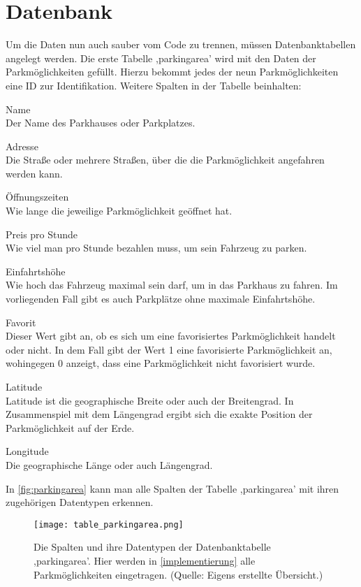 \section{Datenbank}
Um die Daten nun auch sauber vom Code zu trennen, müssen Datenbanktabellen angelegt werden. Die erste Tabelle ,parkingarea' wird mit den Daten der Parkmöglichkeiten gefüllt. Hierzu bekommt jedes der neun Parkmöglichkeiten eine ID zur Identifikation. Weitere Spalten in der Tabelle beinhalten:
\begin{description}
	\item Name \\ Der Name des Parkhauses oder Parkplatzes.
	\item Adresse \\ Die Straße oder mehrere Straßen, über die die Parkmöglichkeit angefahren werden kann.
	\item Öffnungszeiten \\ Wie lange die jeweilige Parkmöglichkeit geöffnet hat.
	\item Preis pro Stunde \\ Wie viel man pro Stunde bezahlen muss, um sein Fahrzeug zu parken.
	\item Einfahrtshöhe \\ Wie hoch das Fahrzeug maximal sein darf, um in das Parkhaus zu fahren. Im vorliegenden Fall gibt es auch Parkplätze ohne maximale Einfahrtshöhe.
	\item Favorit \\ Dieser Wert gibt an, ob es sich um eine favorisiertes Parkmöglichkeit handelt oder nicht. In dem Fall gibt der Wert 1 eine favorisierte Parkmöglichkeit an, wohingegen 0 anzeigt, dass eine Parkmöglichkeit nicht favorisiert wurde.
	\item Latitude \\ Latitude ist die geographische Breite oder auch der Breitengrad. In Zusammenspiel mit dem Längengrad ergibt sich die exakte Position der Parkmöglichkeit auf der Erde.
	\item Longitude \\ Die geographische Länge oder auch Längengrad.
\end{description}
In \autoref{fig:parkingarea} kann man alle Spalten der Tabelle ,parkingarea' mit ihren zugehörigen Datentypen erkennen.

\begin{figure}[h]
	\centering
	\texttt{[image: table\_parkingarea.png]}
	\caption[Die Spalten und ihre Datentypen der Datenbanktabelle ,parkingarea'. Hier werden in \autoref{implementierung} alle Parkmöglichkeiten eingetragen.]
	{Die Spalten und ihre Datentypen der Datenbanktabelle ,parkingarea'. Hier werden in \autoref{implementierung} alle Parkmöglichkeiten eingetragen. (Quelle: Eigens erstellte Übersicht.)}
	\label{fig:parkingarea}
\end{figure}

